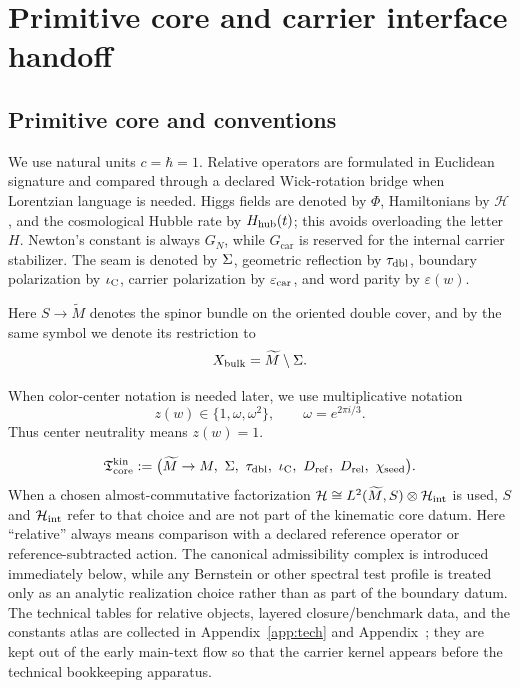 
\section{Primitive core and carrier interface handoff}

\subsection{Primitive core and conventions}

We use natural units $c=\hbar=1$. Relative operators are formulated in Euclidean signature and compared through a declared Wick-rotation bridge when Lorentzian language is needed. Higgs fields are denoted by $\Phi$, Hamiltonians by $\mathcal H$, and the cosmological Hubble rate by $H_{\mathrm{hub}}(t)$; this avoids overloading the letter $H$. Newton's constant is always $G_N$, while $G_{\mathrm{car}}$ is reserved for the internal carrier stabilizer. The seam is denoted by $\Sigma$, geometric reflection by $\tau_{\mathrm{dbl}}$, boundary polarization by $\iota_{\mathrm C}$, carrier polarization by $\varepsilon_{\mathrm{car}}$, and word parity by $\varepsilon(w)$.

Here $S\to \widetilde M$ denotes the spinor bundle on the oriented double cover, and by the same symbol we denote its restriction to
\[
X_{\mathrm{bulk}}=\widetilde M\setminus\Sigma.
\]

When color-center notation is needed later, we use multiplicative notation
\[
z(w)\in\{1,\omega,\omega^2\},
\qquad
\omega=e^{2\pi i/3}.
\]
Thus center neutrality means $z(w)=1$.

\[
\Tcore^{\mathrm{kin}}
:=
\bigl(
\widetilde M\to M,\ \Seam,\ \taudbl,\ \iC,\ D_{\mathrm{ref}},\ D_{\mathrm{rel}},\ \chiseed
\bigr).
\]
When a chosen almost-commutative factorization
$\mathcal H\cong L^2(\widetilde M,S)\otimes\mathcal H_{\mathrm{int}}$ is used, $S$ and $\mathcal H_{\mathrm{int}}$ refer to that
choice and are not part of the kinematic core datum.
Here \enquote{relative} always means comparison with a declared reference operator or
reference-subtracted action. The canonical admissibility complex is introduced immediately below,
while any Bernstein or other spectral test profile is treated only as an analytic realization
choice rather than as part of the boundary datum. The technical tables for relative objects,
layered closure/benchmark data, and the constants atlas are collected in
Appendix~\ref{app:tech} and Appendix~; they are kept out of the early
main-text flow so that the carrier kernel appears before the technical bookkeeping apparatus.


